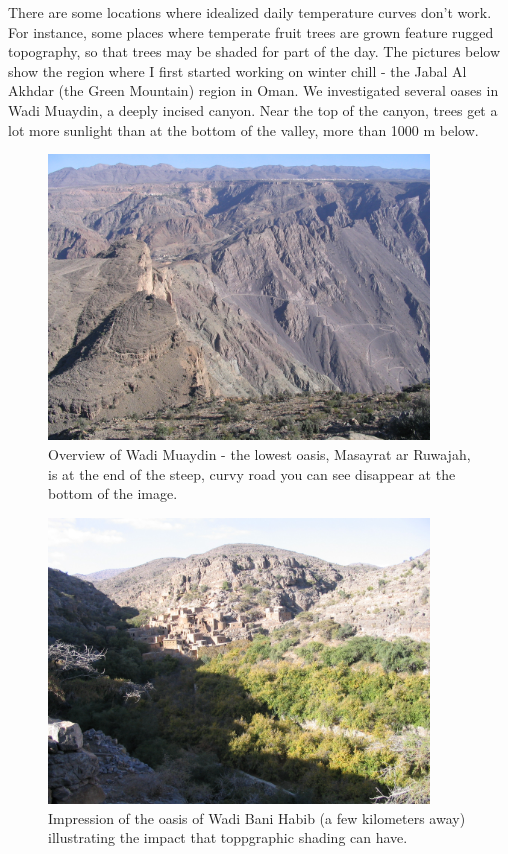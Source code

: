 \documentclass[
]{book}
\begin{document}
There are some locations where idealized daily temperature curves don't work. For instance, some places where temperate fruit trees are grown feature rugged topography, so that trees may be shaded for part of the day. The pictures below show the region where I first started working on winter chill - the Jabal Al Akhdar (the Green Mountain) region in Oman. We investigated several oases in Wadi Muaydin, a deeply incised canyon. Near the top of the canyon, trees get a lot more sunlight than at the bottom of the valley, more than 1000 m below.

\begin{figure}
\centering
\includegraphics[width=0.9\textwidth,height=\textheight]{pictures/IMG_5403.JPG}
\caption{Overview of Wadi Muaydin - the lowest oasis, Masayrat ar Ruwajah, is at the end of the steep, curvy road you can see disappear at the bottom of the image.}
\end{figure}

\begin{figure}
\centering
\includegraphics[width=0.9\textwidth,height=\textheight]{pictures/IMG_5573.JPG}
\caption{Impression of the oasis of Wadi Bani Habib (a few kilometers away) illustrating the impact that toppgraphic shading can have.}
\end{figure}
\end{document}

